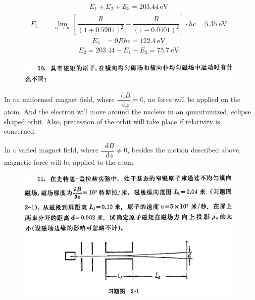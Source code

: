 \documentclass{article}
\newcommand*{\md}{\mathop{}\!\mathrm{d}}
\begin{document}
\begin{equation*}
  \begin{aligned}
    E_1 + E_2 + E_3 = 203.44 \  \mathrm{eV}
  \end{aligned}
\end{equation*}
\begin{equation*}
  \begin{aligned}
    E_1 &= \lim_{n \rightarrow \infty} \left[ \dfrac{R}{\left( 1 + 0.5901 \right)^2} - \dfrac{R}{\left( 1 - 0.0401 \right)^2}   \right] \cdot h c = 5.35 \  \mathrm{eV}
  \end{aligned}
\end{equation*}
\begin{equation*}
  \begin{aligned}
    E_3 &= 9 R h c = 122.4 \  \mathrm{eV}
  \end{aligned}
\end{equation*}
\begin{equation*}
  \begin{aligned}
    E_2 = 203.44 - E_1 - E_2 = 75.7 \  \mathrm{eV}
  \end{aligned}
\end{equation*}

\begin{figure}[H]
  \centering
  \includegraphics[width=\linewidth]{figures/Problem10}
  \label{fig:}
\end{figure}

In an uniformed magnet field, where $\dfrac{\md B}{\md z} = 0 $, no force will be applied on the atom. And the electron will move around the nucleus in an qumntumized, eclipse shaped orbit. Also, precession of the orbit will take place if relativity is concerned.

In a varied magnet field, where $\dfrac{\md B}{\md z} \neq 0 $, besides the motion described above, magnetic force will be applied to the atom.

\begin{figure}[H]
  \centering
  \includegraphics[width=\linewidth]{figures/Problem11}
  \label{fig:}
\end{figure}
\end{document}
